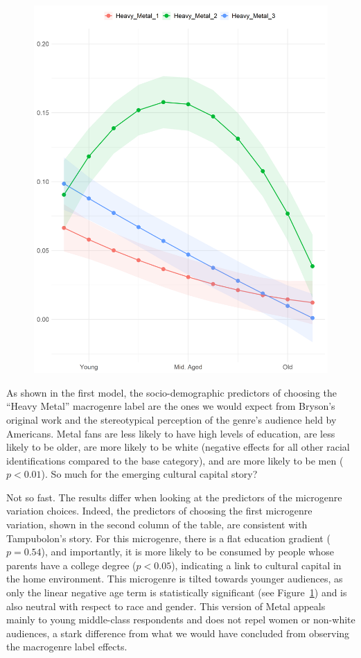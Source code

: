 \documentclass[a4paper,12pt]{extarticle}
\begin{document}
\begin{figure}[ht!]
    \centering    \includegraphics[width=1.0\textwidth]{Plots/Demog/micro-by-age-metal.png}
    \caption{}
    \label{fig:age-metal}
\end{figure}

As shown in the first model, the socio-demographic predictors of choosing the ``Heavy Metal'' macrogenre label are the ones we would expect from Bryson's original work and the stereotypical perception of the genre's audience held by Americans. Metal fans are less likely to have high levels of education, are less likely to be older, are more likely to be white (negative effects for all other racial identifications compared to the base category), and are more likely to be men ($p<0.01$). So much for the emerging cultural capital story?

Not so fast. The results differ when looking at the predictors of the microgenre variation choices. Indeed, the predictors of choosing the first microgenre variation, shown in the second column of the table, are consistent with Tampubolon's story. For this microgenre, there is a flat education gradient ($p = 0.54$), and importantly, it is more likely to be consumed by people whose parents have a college degree ($p < 0.05$), indicating a link to cultural capital in the home environment. This microgenre is tilted towards younger audiences, as only the linear negative age term is statistically significant (see Figure~\ref{fig:age-metal}) and is also neutral with respect to race and gender. This version of Metal appeals mainly to young middle-class respondents and does not repel women or non-white audiences, a stark difference from what we would have concluded from observing the macrogenre label effects. 
\end{document}
